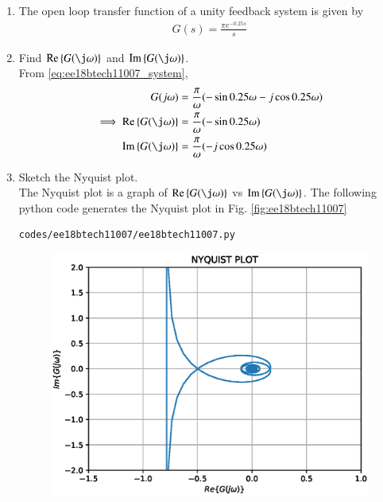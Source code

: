 \begin{enumerate}[label=\thesubsection.\arabic*.,ref=\thesubsection.\theenumi]
\item The open loop transfer function of a unity feedback system is given by
\begin{align}
\label{eq:ee18btech11007_system}
 G(s)=\frac{\pi e^{-0.25s}}{s}
\end{align}
\item Find $\text{Re} \cbrak{G(\j \omega)}$ and $\text{Im} \cbrak{G(\j \omega)}$.
\\
\solution From \eqref{eq:ee18btech11007_system},
%
\begin{align}
G(j\omega)&=\frac{\pi}{\omega}(-\sin{0.25\omega}-j\cos{0.25\omega})
\\
\implies  \text{Re} \cbrak{G(\j \omega)}&=\frac{\pi}{\omega}(-\sin{0.25\omega}) 
\\
 \text{Im} \cbrak{G(\j \omega)}&=\frac{\pi}{\omega}(-j\cos{0.25\omega}) 
\end{align}
%
\item Sketch the Nyquist plot.
\\
\solution The Nyquist plot is a graph of $\text{Re} \cbrak{G(\j \omega)}$  vs $\text{Im} \cbrak{G(\j \omega)}$.
The following python code generates the Nyquist plot in Fig.  \ref{fig:ee18btech11007}
\begin{lstlisting}
codes/ee18btech11007/ee18btech11007.py
\end{lstlisting}
%
\begin{figure}[!h]
  \includegraphics[width=\columnwidth]{./figs/ee18btech11007.eps}

\end{figure}
\end{enumerate}
